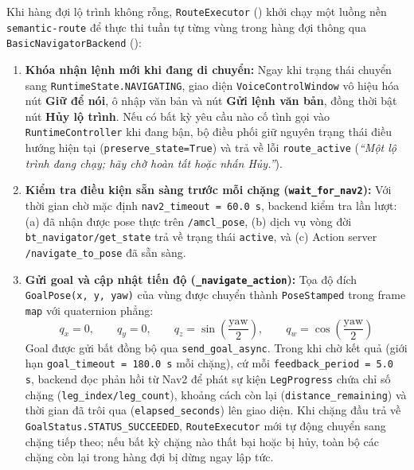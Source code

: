 Khi hàng đợi lộ trình không rỗng, \texttt{RouteExecutor} () khởi chạy một luồng nền \texttt{semantic-route} để thực thi tuần tự từng vùng trong hàng đợi thông qua \texttt{BasicNavigatorBackend} ():
\begin{enumerate}[leftmargin=1.2cm]
  \item \textbf{Khóa nhận lệnh mới khi đang di chuyển:} Ngay khi trạng thái chuyển sang \texttt{RuntimeState.NAVIGATING}, giao diện \texttt{VoiceControlWindow} vô hiệu hóa nút \textbf{Giữ để nói}, ô nhập văn bản và nút \textbf{Gửi lệnh văn bản}, đồng thời bật nút \textbf{Hủy lộ trình}. Nếu có bất kỳ yêu cầu nào cố tình gọi vào \texttt{RuntimeController} khi đang bận, bộ điều phối giữ nguyên trạng thái điều hướng hiện tại (\texttt{preserve\_state=True}) và trả về lỗi \texttt{route\_active} (\textit{``Một lộ trình đang chạy; hãy chờ hoàn tất hoặc nhấn Hủy.''}).
  \item \textbf{Kiểm tra điều kiện sẵn sàng trước mỗi chặng (\texttt{wait\_for\_nav2}):} Với thời gian chờ mặc định \texttt{nav2\_timeout = 60.0\,s}, backend kiểm tra lần lượt: (a) đã nhận được pose thực trên \texttt{/amcl\_pose}, (b) dịch vụ vòng đời \texttt{bt\_navigator/get\_state} trả về trạng thái \texttt{active}, và (c) Action server \texttt{/navigate\_to\_pose} đã sẵn sàng.
  \item \textbf{Gửi goal và cập nhật tiến độ (\texttt{\_navigate\_action}):} Tọa độ đích \texttt{GoalPose(x, y, yaw)} của vùng được chuyển thành \texttt{PoseStamped} trong frame \texttt{map} với quaternion phẳng:
  \begin{equation}
    q_x = 0, \qquad q_y = 0, \qquad q_z = \sin\left(\frac{\text{yaw}}{2}\right), \qquad q_w = \cos\left(\frac{\text{yaw}}{2}\right)
  \end{equation}
  Goal được gửi bất đồng bộ qua \texttt{send\_goal\_async}. Trong khi chờ kết quả (giới hạn \texttt{goal\_timeout = 180.0\,s} mỗi chặng), cứ mỗi \texttt{feedback\_period = 5.0\,s}, backend đọc phản hồi từ Nav2 để phát sự kiện \texttt{LegProgress} chứa chỉ số chặng (\texttt{leg\_index/leg\_count}), khoảng cách còn lại (\texttt{distance\_remaining}) và thời gian đã trôi qua (\texttt{elapsed\_seconds}) lên giao diện. Khi chặng đầu trả về \texttt{GoalStatus.STATUS\_SUCCEEDED}, \texttt{RouteExecutor} mới tự động chuyển sang chặng tiếp theo; nếu bất kỳ chặng nào thất bại hoặc bị hủy, toàn bộ các chặng còn lại trong hàng đợi bị dừng ngay lập tức.

\end{enumerate}
